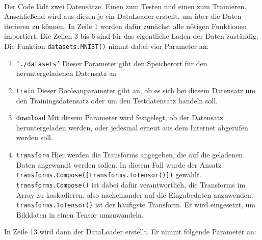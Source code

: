 \documentclass[11pt]{article}
\begin{document}
\\
Der Code lädt zwei Datensätze. Einen zum Testen und einen zum Trainieren. Anschließend wird aus diesen je ein DataLoader erstellt, um über die Daten iterieren zu können. In Zeile 1 werden dafür zunächst alle nötigen Funktionen importiert. Die Zeilen 3 bis 6 sind für das eigentliche Laden der Daten zuständig. \\
Die Funktion \texttt{datasets.MNIST()} nimmt dabei vier Parameter an:
\begin{enumerate}
	\item \texttt{'./datasets'} Dieser Parameter gibt den Speicherort für den heruntergeladenen Datensatz an
	\item \texttt{train} Dieser Booleanparameter gibt an, ob es sich bei diesem Datensatz um den Trainingsdatensatz oder um den Testdatensatz handeln soll.
	\item \texttt{download} Mit diesem Parameter wird festgelegt, ob der Datensatz heruntergeladen werden, oder jedesmal erneut aus dem Internet abgerufen werden soll.
	\item \texttt{transform} Hier werden die Transforms angegeben, die auf die geladenen Daten angewandt werden sollen. In diesem Fall wurde der Ansatz\\ \texttt{transforms.Compose([transforms.ToTensor()])} gewählt.\\ \texttt{transforms.Compose()} ist dabei dafür verantwortlich, die Transforms im Array zu kaskadieren, also nacheinander auf die Eingabedaten anzuwenden. \\
	\texttt{transforms.ToTensor()} ist der häufigste Transform. Er wird eingesetzt, um Bilddaten in einen Tensor umzuwandeln.
\end{enumerate}
In Zeile 13 wird dann der DataLoader erstellt. Er nimmt folgende Parameter an:
\end{document}
